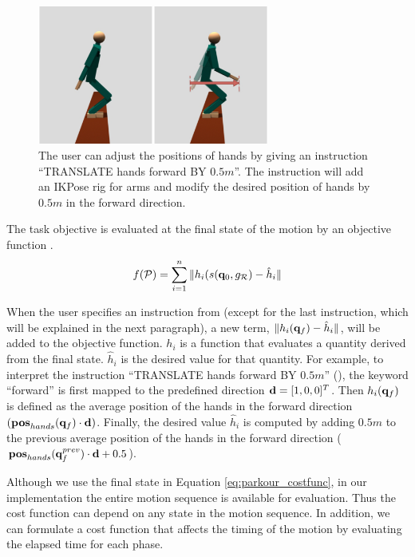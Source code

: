 \begin{figure}[tb]
\center
  \includegraphics[width=3.0in]{images/instruction_demo}
  \caption{
    The user can adjust the positions of hands by giving an instruction
    ``TRANSLATE hands forward BY $0.5m$''.
    The instruction will add an IKPose rig for arms 
    and modify the desired position of hands by $0.5m$ in the forward direction.
  }
  \label{fig:parkour_instruction_demo}
\end{figure}


The task objective is evaluated at the final state of the motion by an objective
function
.
\begin{equation}
  f(\mathcal{P}) = \sum_{i=1}^n\|h_i(s(\mathbf{q}_0, g_{\mathcal{R}}) - \hat{h}_i\|
\label{eq:parkour_costfunc}
\end{equation}

When the user specifies an instruction from  
(except for the last instruction, which will be explained in the next paragraph), a new term, $\|h_i(\mathbf{q}_f) - \hat{h}_i\|$, 
will be added to the objective function. 
$h_i$ is a function that evaluates a quantity derived from the final state. $\hat{h}_i$ is the desired value for
that quantity. 
For example, to interpret the instruction 
``TRANSLATE hands forward BY $0.5m$'' (), 
the keyword ``forward'' is first
mapped to the predefined direction $\mathbf{d}=[1,0,0]^T$.
Then $h_i(\mathbf{q}_f)$ is defined as the average position of the hands
in the forward direction $(\mathbf{pos}_{hands}(\mathbf{q}_f) \cdot \mathbf{d})$.
Finally, the desired value $\hat{h}_i$ is computed by adding $0.5m$
to the previous average position of the hands in the forward direction
($\mathbf{pos}_{hands}(\mathbf{q}^{prev}_f) \cdot \mathbf{d} + 0.5$).

Although we use the final state in Equation \ref{eq:parkour_costfunc}, in our
implementation the entire motion sequence is available for
evaluation. Thus the cost function can depend on any state in the motion sequence. In
addition, we can formulate a cost function that affects the timing
of the motion by evaluating the elapsed time for each phase.

